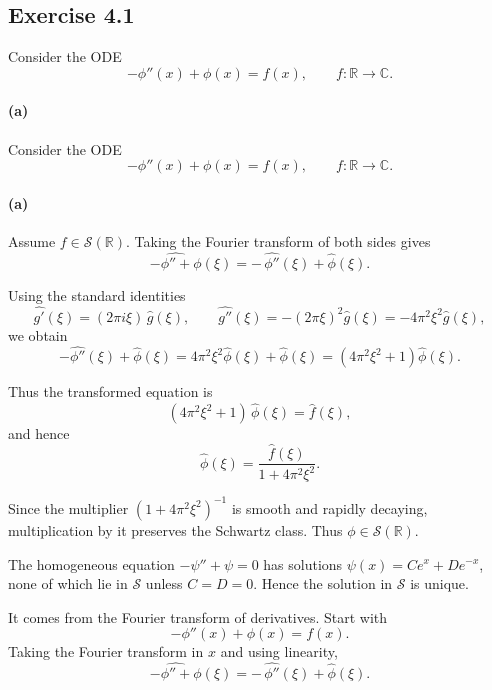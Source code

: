 \documentclass[12pt,a4paper]{article}
\theoremstyle{plain}
\theoremstyle{definition}
\theoremstyle{remark}
\theoremstyle{remark}
\begin{document}
\subsection*{Exercise 4.1}

Consider the ODE
\begin{equation}
	-\phi''(x) + \phi(x) = f(x), \qquad f:\mathbb{R}\to\mathbb{C}.
\end{equation}

\paragraph{(a)}
Consider the ODE
\begin{equation}
	-\phi''(x) + \phi(x) = f(x), \qquad f:\mathbb{R}\to\mathbb{C}.
\end{equation}

\paragraph{(a)}
Assume $f\in\mathcal{S}(\mathbb{R})$.  
Taking the Fourier transform of both sides gives
\[
\widehat{-\phi'' + \phi}(\xi)
= -\,\widehat{\phi''}(\xi) + \widehat{\phi}(\xi).
\]

Using the standard identities
\[
\widehat{g'}(\xi) = (2\pi i\xi)\,\widehat{g}(\xi),
\qquad
\widehat{g''}(\xi) = -(2\pi\xi)^{2}\widehat{g}(\xi)
= -4\pi^{2}\xi^{2}\widehat{g}(\xi),
\]
we obtain
\[
-\widehat{\phi''}(\xi) + \widehat{\phi}(\xi)
= 4\pi^{2}\xi^{2}\widehat{\phi}(\xi) + \widehat{\phi}(\xi)
= (4\pi^{2}\xi^{2} + 1)\widehat{\phi}(\xi).
\]

Thus the transformed equation is
\[
(4\pi^{2}\xi^{2} + 1)\,\widehat{\phi}(\xi) = \widehat{f}(\xi),
\]
and hence
\[
\boxed{
	\widehat{\phi}(\xi)
	= \frac{\widehat{f}(\xi)}{1 + 4\pi^{2}\xi^{2}}.
}
\]

Since the multiplier $(1+4\pi^{2}\xi^{2})^{-1}$ is smooth and rapidly decaying,
multiplication by it preserves the Schwartz class.  
Thus $\phi\in\mathcal{S}(\mathbb{R})$.

The homogeneous equation $-\psi''+\psi=0$ has solutions
$\psi(x)=Ce^{x}+De^{-x}$, none of which lie in $\mathcal{S}$ unless $C=D=0$.
Hence the solution in $\mathcal{S}$ is unique.

\medskip
\noindent
It comes from the Fourier transform of derivatives.  
Start with
\[
-\phi''(x)+\phi(x)=f(x).
\]
Taking the Fourier transform in $x$ and using linearity,
\[
\widehat{-\phi''+\phi}(\xi)
= -\,\widehat{\phi''}(\xi) + \widehat{\phi}(\xi).
\]
\end{document}

